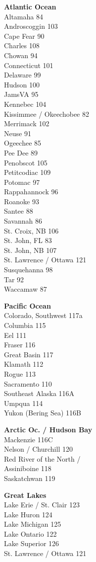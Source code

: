 \documentclass[11pt]{article}
\begin{document}
\begin{multicols}{3}
\textbf{Atlantic Ocean}\\
Altamaha 84\\
Androscoggin 103\\
Cape Fear 90\\
Charles 108\\
Chowan 94\\
Connecticut 101\\
Delaware 99\\
Hudson 100\\
JamsVA 95\\
Kennebec 104\\
Kissimmee / Okeechobee 82\\
Merrimack 102\\
Neuse 91\\
Ogeechee 85\\
Pee Dee 89\\
Penobscot 105\\
Petitcodiac 109\\
Potomac 97\\
Rappahannock 96\\
Roanoke 93\\
Santee 88\\
Savannah 86\\
St. Croix, NB 106\\
St. John, FL 83\\
St. John, NB 107\\
St. Lawrence / Ottawa 121\\
Susquehanna 98\\
Tar 92\\
Waccamaw 87
\vspace{0.5\baselineskip}

\textbf{Pacific Ocean}\\
Colorado, Southwest 117a\\
Columbia 115\\
Eel 111\\
Fraser 116\\
Great Basin 117\\
Klamath 112\\
Rogue 113\\
Sacramento 110\\
Southeast Alaska 116A\\
Umpqua 114\\
Yukon (Bering Sea) 116B
\vspace{0.5\baselineskip}

\textbf{Arctic Oc. / Hudson Bay}\\
Mackenzie 116C\\
Nelson / Churchill 120\\
Red River of the North /\\ \quad Assiniboine 118\\
Saskatchwan 119
\vspace{0.5\baselineskip}

\textbf{Great Lakes}\\
Lake Erie / St. Clair 123\\
Lake Huron 124\\
Lake Michigan 125\\
Lake Ontario 122\\
Lake Superior 126\\
St. Lawrence / Ottawa 121
\end{multicols}
\end{document}
